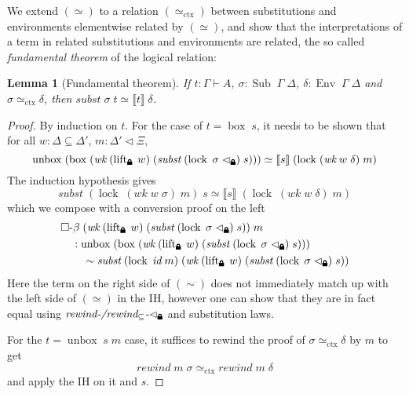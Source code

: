 \documentclass{article}
\newtheorem{lemma}[theorem]{Lemma}
\theoremstyle{definition}\newtheorem{definition}{Definition}
\newcommand{\lock}{\text{\tikz[baseline]{
      \fill[rounded corners=.1ex] (-.75ex,0) rectangle (.75ex,1ex);
      \draw[line width=.3ex] (-.4ex,.5ex) -- ++(0,.75ex) arc (180:0:.4ex) -- ++(0,-.75ex);
}}}
\begin{document}
We extend $(\simeq)$ to a relation $(\simeq_\text{ctx})$
between substitutions and environments elementwise related by $(\simeq)$,
and show that
the interpretations of a term in related substitutions and environments are related,
the so called \emph{fundamental theorem} of the logical relation:
\begin{lemma}[Fundamental theorem]
  If $t : \Gamma \vdash A$, $\sigma : \operatorname{Sub} \; \Gamma \; \Delta$,
  $\delta : \operatorname{Env} \; \Gamma \; \Delta$
  and $\sigma \simeq_\text{ctx} \delta$,
  then $\textit{subst} \; \sigma \; t \simeq \llbracket t \rrbracket \; \delta$.
\end{lemma}
\begin{proof}
  By induction on $t$.
  For the case of $t = \operatorname{box} \; s$, it needs to be shown that for all
  $w : \Delta \subseteq \Delta'$, $m : \Delta' \lhd \Xi$,
  \begin{equation*}
    \operatorname{unbox} \; (\operatorname{box} \; (\textit{wk} \; (\operatorname{lift}_\lock \; w) \; (\textit{subst} \; (\operatorname{lock} \; \sigma \; \lhd_\lock) \; s)))
    \simeq \llbracket s \rrbracket \; (\operatorname{lock} \; (\textit{wk} \; w \; \delta) \; m)
  \end{equation*}
  The induction hypothesis gives
  $$ \textit{subst} \; (\operatorname{lock} \; (\textit{wk} \; w \; \sigma) \; m) \; s \simeq \llbracket s \rrbracket \; (\operatorname{lock} \; (\textit{wk} \; w \; \delta) \; m) $$
  which we compose with a conversion proof on the left
  \begin{equation*}
    \begin{split}
      &\Box\text{-}\beta \; (\textit{wk} \; (\operatorname{lift}_\lock \; w) \; (\textit{subst} \; (\operatorname{lock} \; \sigma \; \lhd_\lock) \; s)) \; m \\
      &\quad : \operatorname{unbox} \; (\operatorname{box} \; (\textit{wk} \; (\operatorname{lift}_\lock \; w) \; (\textit{subst} \; (\operatorname{lock} \; \sigma \; \lhd_\lock) \; s))) \\
      &\qquad \sim \textit{subst} \; (\operatorname{lock} \; \textit{id} \; m) \; (\textit{wk} \; (\operatorname{lift}_\lock \; w) \; (\textit{subst} \; (\operatorname{lock} \; \sigma \; \lhd_\lock) \; s))
    \end{split}
  \end{equation*}
  Here the term on the right side of $(\sim)$ does not immediately match up
  with the left side of $(\simeq)$ in the IH,
  however one can show that they are in fact equal
  using $\textit{rewind-/rewind$_\subseteq$-}\lhd_\lock$ and substitution laws.

  For the $t = \operatorname{unbox} \; s \; m$ case,
  it suffices to rewind the proof of $\sigma\simeq_\text{ctx}\delta$ by $m$ to get
  $$ \textit{rewind} \; m \; \sigma \simeq_\text{ctx} \textit{rewind} \; m \; \delta $$
  and apply the IH on it and $s$.
\end{proof}
\end{document}
